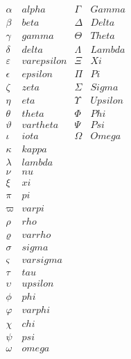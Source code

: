 \documentclass{article}
\begin{document}
$\begin{array}{ccccc}
  \alpha & alpha & \Gamma & Gamma\\
  \beta & beta & \Delta & Delta\\
  \gamma & gamma & \Theta & Theta\\
  \delta & delta & \Lambda & Lambda\\
  \varepsilon & varepsilon & \Xi & Xi\\
  \epsilon & epsilon & \Pi &Pi \\
  \zeta & zeta & \Sigma & Sigma\\
  \eta & eta & \Upsilon & Upsilon\\
  \theta & theta & \Phi & Phi\\
  \vartheta & vartheta & \Psi & Psi\\
  \iota & iota & \Omega & Omega\\
  \kappa & kappa & \\
  \lambda & lambda & \\
  \nu & nu & \\
  \xi & xi & \\
  \pi & pi & \\
  \varpi & varpi & \\
  \rho & rho & \\
  \varrho & varrho & \\
  \sigma & sigma & \\
  \varsigma & varsigma & \\
  \tau & tau & \\
  \upsilon & upsilon & \\
  \phi & phi & \\
  \varphi & varphi & \\
  \chi & chi & \\
  \psi & psi & \\
  \omega & omega & 
\end{array}$
\end{document}
